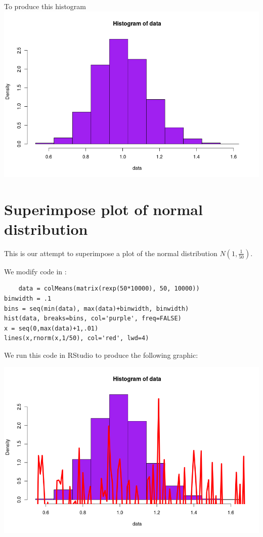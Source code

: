 \documentclass[a4paper,11pt]{article}
\begin{document}
To produce this histogram
\includegraphics[scale=0.5]{hist-50-exp}

\section{Superimpose plot of normal distribution}

This is our attempt to superimpose a plot of the normal distribution
$N\left( 1, \frac{1}{50}\right)$.

We modify code in \cite{studio3r}:
\begin{lstlisting}
	data = colMeans(matrix(rexp(50*10000), 50, 10000))
binwidth = .1
bins = seq(min(data), max(data)+binwidth, binwidth)
hist(data, breaks=bins, col='purple', freq=FALSE)
x = seq(0,max(data)+1,.01)
lines(x,rnorm(x,1/50), col='red', lwd=4)
\end{lstlisting}

We run this code in RStudio to produce the following graphic:

\includegraphics[scale=0.5]{superimpose}

\printbibliography{}
\end{document}
